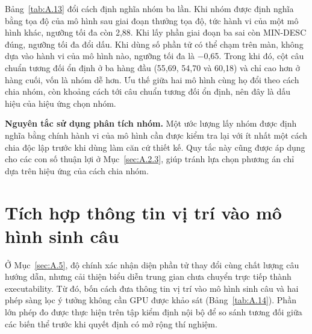Bảng~\ref{tab:A.13} đổi cách định nghĩa nhóm ba lần. Khi nhóm được định nghĩa bằng tọa độ của mô hình sau giai đoạn thưởng tọa độ, tức hành vi của một mô hình khác, ngưỡng tối đa còn 2,88. Khi lấy phần giai đoạn ba sai còn MIN-DESC đúng, ngưỡng tối đa đổi dấu. Khi dùng số phần tử có thể chạm trên màn, không dựa vào hành vi của mô hình nào, ngưỡng tối đa là $-$0,65. Trong khi đó, cột câu chuẩn tương đối ổn định ở ba hàng đầu (55,69, 54,70 và 60,18) và chỉ cao hơn ở hàng cuối, vốn là nhóm dễ hơn. Ưu thế giữa hai mô hình cùng họ đổi theo cách chia nhóm, còn khoảng cách tới câu chuẩn tương đối ổn định, nên đây là dấu hiệu của hiệu ứng chọn nhóm.

\textbf{Nguyên tắc sử dụng phân tích nhóm.} Một ước lượng lấy nhóm được định nghĩa bằng chính hành vi của mô hình cần được kiểm tra lại với ít nhất một cách chia độc lập trước khi dùng làm căn cứ thiết kế. Quy tắc này cũng được áp dụng cho các con số thuận lợi ở Mục~\ref{sec:A.2.3}, giúp tránh lựa chọn phương án chỉ dựa trên hiệu ứng của cách chia nhóm.

\section{Tích hợp thông tin vị trí vào mô hình sinh câu}\label{sec:A.6}

Ở Mục~\ref{sec:A.5}, độ chính xác nhận diện phần tử thay đổi cùng chất lượng câu hướng dẫn, nhưng cải thiện biểu diễn trung gian chưa chuyển trực tiếp thành executability. Từ đó, bốn cách đưa thông tin vị trí vào mô hình sinh câu và hai phép sàng lọc ý tưởng không cần GPU được khảo sát (Bảng~\ref{tab:A.14}). Phần lớn phép đo được thực hiện trên tập kiểm định nội bộ để so sánh tương đối giữa các biến thể trước khi quyết định có mở rộng thí nghiệm.

